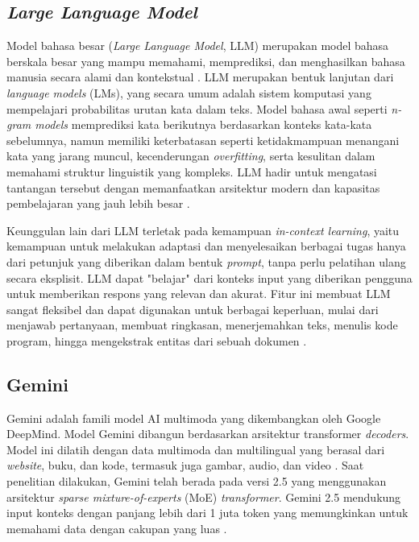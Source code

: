 \subsection{\textit{Large Language Model}}
Model bahasa besar (\textit{Large Language Model}, LLM) merupakan model bahasa berskala besar yang mampu memahami, memprediksi, dan menghasilkan bahasa manusia secara alami dan kontekstual \cite{Chang2024SurveyonLLM}.
LLM merupakan bentuk lanjutan dari \textit{language models} (LMs), yang secara umum adalah sistem komputasi yang mempelajari probabilitas urutan kata dalam teks.
Model bahasa awal seperti \textit{n-gram models} memprediksi kata berikutnya berdasarkan konteks kata-kata sebelumnya, namun memiliki keterbatasan seperti ketidakmampuan menangani kata yang jarang muncul, kecenderungan \textit{overfitting}, serta kesulitan dalam memahami struktur linguistik yang kompleks.
LLM hadir untuk mengatasi tantangan tersebut dengan memanfaatkan arsitektur modern dan kapasitas pembelajaran yang jauh lebih besar \cite{Chang2024SurveyonLLM}.

Keunggulan lain dari LLM terletak pada kemampuan \textit{in-context learning}, yaitu kemampuan untuk melakukan adaptasi dan menyelesaikan berbagai tugas hanya dari petunjuk yang diberikan dalam bentuk \textit{prompt}, tanpa perlu pelatihan ulang secara eksplisit.
LLM dapat "belajar" dari konteks input yang diberikan pengguna untuk memberikan respons yang relevan dan akurat.
Fitur ini membuat LLM sangat fleksibel dan dapat digunakan untuk berbagai keperluan, mulai dari menjawab pertanyaan, membuat ringkasan, menerjemahkan teks, menulis kode program, hingga mengekstrak entitas dari sebuah dokumen \cite{Chang2024SurveyonLLM}.

\subsection{Gemini}
Gemini adalah famili model AI multimoda yang dikembangkan oleh Google DeepMind.
Model Gemini dibangun berdasarkan arsitektur transformer \textit{decoders}.
Model ini dilatih dengan data multimoda dan multilingual yang berasal dari \textit{website}, buku, dan kode, termasuk juga gambar, audio, dan video \cite{saeidnia2023welcomeGemini}.
Saat penelitian dilakukan, Gemini telah berada pada versi 2.5 yang menggunakan arsitektur  \textit{sparse mixture-of-experts} (MoE) \textit{transformer}.
Gemini 2.5 mendukung input konteks dengan panjang lebih dari 1 juta token yang memungkinkan untuk memahami data dengan cakupan yang luas \cite{comanici2025gemini2.5}.



